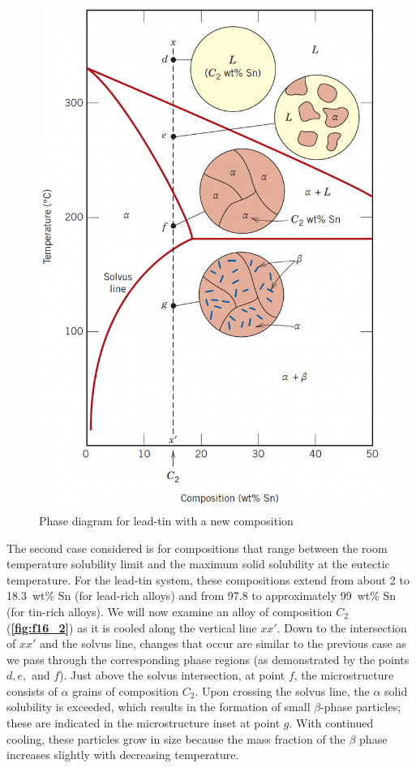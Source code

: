 \begin{figure} [ht]
  \centering
  \includegraphics[width=0.35\linewidth]{./figures/f16_2.png}
  \caption{Phase diagram for lead-tin with a new composition}
  \label{fig:f16_2}
\end{figure}
The second case considered is for compositions that range between the room temperature solubility limit and the maximum solid solubility at the eutectic temperature. For the lead-tin system, these compositions extend from about 2 to \qty{18,3}{wt}\% Sn (for lead-rich alloys) and from \num{97,8} to approximately \qty{99}{wt}\% Sn (for tin-rich alloys). We will now examine an alloy of composition $C_2$ (\textbf{\autoref{fig:f16_2}}) as it is cooled along the vertical line $x x'$. Down to the intersection of $ x x'$ and the solvus line, changes that occur are similar to the previous case as we pass through the corresponding phase regions (as demonstrated by the points $d, e,$ and $f$). Just above the solvus intersection, at point $f$, the microstructure consists of $\alpha$ grains of composition $C_2$. Upon crossing the solvus line, the $\alpha$ solid solubility is exceeded, which results in the formation of small $\beta$-phase particles; these are indicated in the microstructure inset at point $g$. With continued cooling, these particles grow in size because the mass fraction of the $\beta$ phase increases slightly with decreasing temperature.

